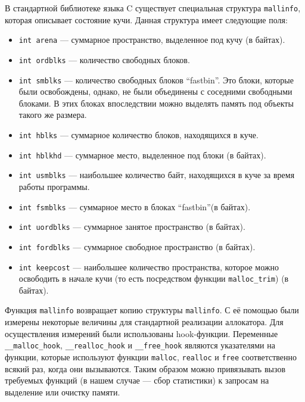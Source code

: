    В стандартной библиотеке языка C существует специальная структура \texttt{mallinfo}, которая описывает состояние кучи. Данная структура имеет следующие поля: 
   \begin{itemize}
   	     \item \texttt{int arena} --- суммарное пространство, выделенное под кучу (в байтах).
         \item \texttt{int ordblks} --- количество свободных блоков.
         \item \texttt{int smblks} --- количество свободных блоков \textquotedblleft fastbin\textquotedblright. Это блоки, которые были освобождены,
         однако, не были объединены с соседними свободными блоками. В этих блоках впоследствии можно 
         выделять память под объекты такого же размера.
          \item \texttt{int hblks} --- суммарное количество блоков, находящихся в куче.
          \item \texttt{int hblkhd} --- суммарное место, выделенное под блоки (в байтах).
          \item \texttt{int usmblks} --- наибольшее количество байт, находящихся в куче за время работы программы.
          \item \texttt{int fsmblks} --- суммарное место в блоках \textquotedblleft fastbin\textquotedblright (в байтах).
          \item \texttt{int uordblks} --- суммарное занятое пространство (в байтах).
          \item \texttt{int fordblks} --- суммарное свободное пространство (в байтах).
          \item \texttt{int keepcost} --- наибольшее количество пространства, которое можно освободить в начале кучи 
          (то есть посредством функции \texttt{malloc\_trim}) (в байтах).
   \end{itemize}
   
   Функция \texttt{mallinfo} возвращает копию структуры \texttt{mallinfo}. С её помощью были измерены некоторые величины для стандартной реализации аллокатора. 
   Для осуществления измерений были использованы hook-функции. Переменные \texttt{\_\_malloc\_hook}, \texttt{\_\_realloc\_hook} и \texttt{\_\_free\_hook} являются 
   указателями на функции, которые используют функции \texttt{malloc}, \texttt{realloc} и \texttt{free} соответственно всякий раз, когда они вызываются. Таким 
   образом можно привязывать вызов требуемых функций (в нашем случае --- сбор статистики) к запросам на выделение или очистку памяти.
   
